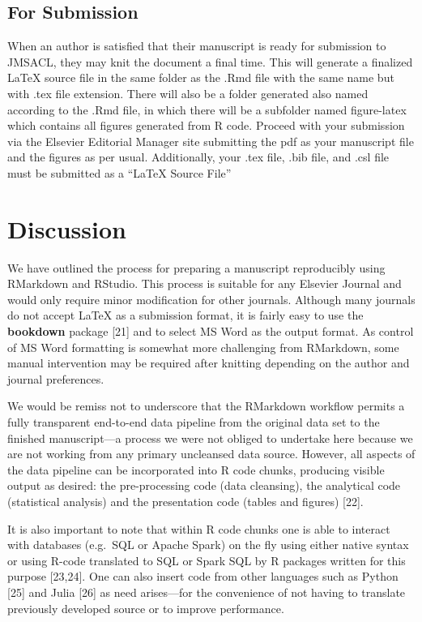 \documentclass[]{elsarticle} %
\begin{document}
\hypertarget{for-submission}{%
\subsection{For Submission}\label{for-submission}}

When an author is satisfied that their manuscript is ready for
submission to JMSACL, they may knit the document a final time. This will
generate a finalized LaTeX source file in the same folder as the .Rmd
file with the same name but with .tex file extension. There will also be
a folder generated also named according to the .Rmd file, in which there
will be a subfolder named figure-latex which contains all figures
generated from R code. Proceed with your submission via the Elsevier
Editorial Manager site submitting the pdf as your manuscript file and
the figures as per usual. Additionally, your .tex file, .bib file, and
.csl file must be submitted as a ``LaTeX Source File''

\hypertarget{discussion}{%
\section{Discussion}\label{discussion}}

We have outlined the process for preparing a manuscript reproducibly
using RMarkdown and RStudio. This process is suitable for any Elsevier
Journal and would only require minor modification for other journals.
Although many journals do not accept LaTeX as a submission format, it is
fairly easy to use the \textbf{bookdown} package {[}21{]} and to select
MS Word as the output format. As control of MS Word formatting is
somewhat more challenging from RMarkdown, some manual intervention may
be required after knitting depending on the author and journal
preferences.

We would be remiss not to underscore that the RMarkdown workflow permits
a fully transparent end-to-end data pipeline from the original data set
to the finished manuscript---a process we were not obliged to undertake
here because we are not working from any primary uncleansed data source.
However, all aspects of the data pipeline can be incorporated into R
code chunks, producing visible output as desired: the pre-processing
code (data cleansing), the analytical code (statistical analysis) and
the presentation code (tables and figures) {[}22{]}.

It is also important to note that within R code chunks one is able to
interact with databases (e.g.~SQL or Apache Spark) on the fly using
either native syntax or using R-code translated to SQL or Spark SQL by R
packages written for this purpose {[}23,24{]}. One can also insert code
from other languages such as Python {[}25{]} and Julia {[}26{]} as need
arises---for the convenience of not having to translate previously
developed source or to improve performance.
\end{document}

